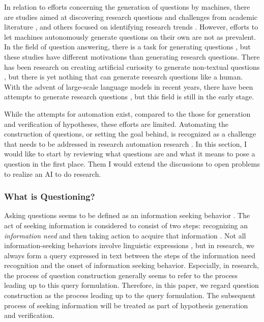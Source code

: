 In relation to efforts concerning the generation of questions by machines, there are studies aimed at discovering research questions and challenges from academic literature \cite{lahav2022search,liu2023creative,oppenlaender2023mapping,surita2020can}, and others focused on identifying research trends \cite{krenn2022scientific,krenn2022predicting}. However, efforts to let machines autonomously generate questions on their own are not as prevalent. In the field of question answering, there is a task for generating questions \cite{pan2019recent,zhang2021review}, but these studies have different motivations than generating research questions. There has been research on creating artificial curiosity to generate non-textual questions \cite{schmidhuber1991possibility}, but there is yet nothing that can generate research questions like a human. With the advent of large-scale language models in recent years, there have been attempts to generate research questions \cite{liu2023creative,lahat2023evaluating}, but this field is still in the early stage.

While the attempts for automation exist, compared to the those for generation and verification of hypotheses, these efforts are limited. Automating the construction of questions, or setting the goal behind, is recognized as a challenge that needs to be addressed in research automation research \cite{coley2020autonomousII,zenil2023,kitano2021nobel}. In this section, I would like to start by reviewing what questions are and what it means to pose a question in the first place. Them I would extend the discussions to open problems to realize an AI to do research.


\subsubsection{What is Questioning?}
Asking questions seems to be defined as an information seeking behavior \cite{watson_2021,taylor1962process}. The act of seeking information is considered to consist of two steps: recognizing an \textit{information need} and then taking action to acquire that information \cite{wilson1997information,case2016looking}. Not all information-seeking behaviors involve linguistic expressions \cite{watson_2021}, but in research, we always form a query expressed in text between the steps of the information need recognition and the onset of information seeking behavior. Especially, in research, the process of question construction generally seems to refer to the process leading up to this query formulation. Therefore, in this paper, we regard question construction as the process leading up to the query formulation. The subsequent process of seeking information will be treated as part of hypothesis generation and verification.


